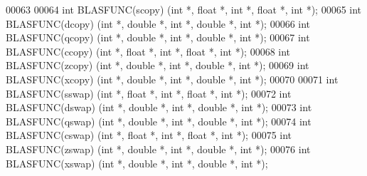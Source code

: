 \begin{DoxyCode}
00063 
00064 \textcolor{keywordtype}{int}    BLASFUNC(scopy) (\textcolor{keywordtype}{int} *, \textcolor{keywordtype}{float}  *, \textcolor{keywordtype}{int} *, \textcolor{keywordtype}{float}  *, \textcolor{keywordtype}{int} *);
00065 \textcolor{keywordtype}{int}    BLASFUNC(dcopy) (\textcolor{keywordtype}{int} *, \textcolor{keywordtype}{double} *, \textcolor{keywordtype}{int} *, \textcolor{keywordtype}{double} *, \textcolor{keywordtype}{int} *);
00066 \textcolor{keywordtype}{int}    BLASFUNC(qcopy) (\textcolor{keywordtype}{int} *, \textcolor{keywordtype}{double} *, \textcolor{keywordtype}{int} *, \textcolor{keywordtype}{double} *, \textcolor{keywordtype}{int} *);
00067 \textcolor{keywordtype}{int}    BLASFUNC(ccopy) (\textcolor{keywordtype}{int} *, \textcolor{keywordtype}{float}  *, \textcolor{keywordtype}{int} *, \textcolor{keywordtype}{float}  *, \textcolor{keywordtype}{int} *);
00068 \textcolor{keywordtype}{int}    BLASFUNC(zcopy) (\textcolor{keywordtype}{int} *, \textcolor{keywordtype}{double} *, \textcolor{keywordtype}{int} *, \textcolor{keywordtype}{double} *, \textcolor{keywordtype}{int} *);
00069 \textcolor{keywordtype}{int}    BLASFUNC(xcopy) (\textcolor{keywordtype}{int} *, \textcolor{keywordtype}{double} *, \textcolor{keywordtype}{int} *, \textcolor{keywordtype}{double} *, \textcolor{keywordtype}{int} *);
00070 
00071 \textcolor{keywordtype}{int}    BLASFUNC(sswap) (\textcolor{keywordtype}{int} *, \textcolor{keywordtype}{float}  *, \textcolor{keywordtype}{int} *, \textcolor{keywordtype}{float}  *, \textcolor{keywordtype}{int} *);
00072 \textcolor{keywordtype}{int}    BLASFUNC(dswap) (\textcolor{keywordtype}{int} *, \textcolor{keywordtype}{double} *, \textcolor{keywordtype}{int} *, \textcolor{keywordtype}{double} *, \textcolor{keywordtype}{int} *);
00073 \textcolor{keywordtype}{int}    BLASFUNC(qswap) (\textcolor{keywordtype}{int} *, \textcolor{keywordtype}{double} *, \textcolor{keywordtype}{int} *, \textcolor{keywordtype}{double} *, \textcolor{keywordtype}{int} *);
00074 \textcolor{keywordtype}{int}    BLASFUNC(cswap) (\textcolor{keywordtype}{int} *, \textcolor{keywordtype}{float}  *, \textcolor{keywordtype}{int} *, \textcolor{keywordtype}{float}  *, \textcolor{keywordtype}{int} *);
00075 \textcolor{keywordtype}{int}    BLASFUNC(zswap) (\textcolor{keywordtype}{int} *, \textcolor{keywordtype}{double} *, \textcolor{keywordtype}{int} *, \textcolor{keywordtype}{double} *, \textcolor{keywordtype}{int} *);
00076 \textcolor{keywordtype}{int}    BLASFUNC(xswap) (\textcolor{keywordtype}{int} *, \textcolor{keywordtype}{double} *, \textcolor{keywordtype}{int} *, \textcolor{keywordtype}{double} *, \textcolor{keywordtype}{int} *);

\end{DoxyCode}
